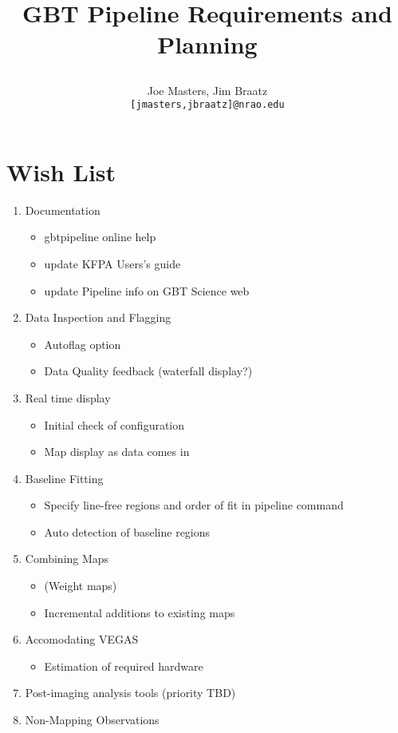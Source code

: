 \documentclass[paper=a4, fontsize=11pt]{scrartcl}	%
\title{ \vspace{-1in} 	\usefont{OT1}{bch}{b}{n}
		\huge \strut GBT Pipeline Requirements and Planning \strut %
}
\author{ 									\usefont{OT1}{bch}{m}{n}
        Joe Masters, Jim Braatz\\		\usefont{OT1}{bch}{m}{n}
        \texttt{[jmasters,jbraatz]@nrao.edu}
}
\date{}
\numberwithin{equation}{section}															%
\numberwithin{figure}{section}																%
\numberwithin{table}{section}																%
\begin{document}
\maketitle
\section{Wish List}
\begin{enumerate}
\item Documentation
  \begin{itemize}
    \item gbtpipeline online help
    \item update KFPA Users's guide
    \item update Pipeline info on GBT Science web
  \end{itemize}
\item Data Inspection and Flagging
  \begin{itemize}
    \item Autoflag option
    \item Data Quality feedback (waterfall display?)
  \end{itemize}
\item Real time display
  \begin{itemize}
    \item Initial check of configuration
    \item Map display as data comes in
  \end{itemize}
\item Baseline Fitting
  \begin{itemize}
    \item Specify line-free regions and order of fit in pipeline command
    \item Auto detection of baseline regions
  \end{itemize}
\item Combining Maps
  \begin{itemize}
    \item (Weight maps)
    \item Incremental additions to existing maps
  \end{itemize}
\item Accomodating VEGAS
  \begin{itemize}
    \item Estimation of required hardware
  \end{itemize}
\item Post-imaging analysis tools (priority TBD)
\item Non-Mapping Observations

\end{enumerate}
\end{document}
